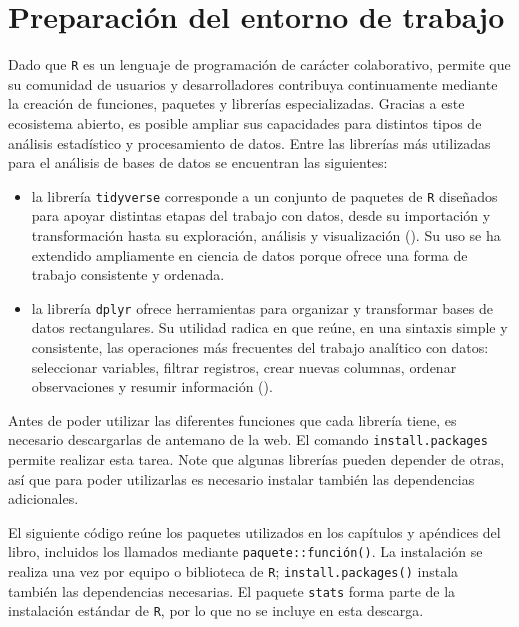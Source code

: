 \documentclass[
  spanish,
  11pt,
  letterpaper,
  oneside,
  open=any]{scrbook}
\begin{document}
\section{Preparación del entorno de
trabajo}\label{preparacion-del-entorno-de-trabajo}

Dado que \texttt{R} es un lenguaje de programación de carácter
colaborativo, permite que su comunidad de usuarios y desarrolladores
contribuya continuamente mediante la creación de funciones, paquetes y
librerías especializadas. Gracias a este ecosistema abierto, es posible
ampliar sus capacidades para distintos tipos de análisis estadístico y
procesamiento de datos. Entre las librerías más utilizadas para el
análisis de bases de datos se encuentran las siguientes:

\begin{itemize}
\item
  la librería \texttt{tidyverse} corresponde a un conjunto de paquetes
  de \texttt{R} diseñados para apoyar distintas etapas del trabajo con
  datos, desde su importación y transformación hasta su exploración,
  análisis y visualización (). Su uso se ha extendido ampliamente en ciencia
  de datos porque ofrece una forma de trabajo consistente y ordenada.
\item
  la librería \texttt{dplyr} ofrece herramientas para organizar y
  transformar bases de datos rectangulares. Su utilidad radica en que
  reúne, en una sintaxis simple y consistente, las operaciones más
  frecuentes del trabajo analítico con datos: seleccionar variables,
  filtrar registros, crear nuevas columnas, ordenar observaciones y
  resumir información ().
\end{itemize}

Antes de poder utilizar las diferentes funciones que cada librería
tiene, es necesario descargarlas de antemano de la web. El comando
\texttt{install.packages} permite realizar esta tarea. Note que algunas
librerías pueden depender de otras, así que para poder utilizarlas es
necesario instalar también las dependencias adicionales.

El siguiente código reúne los paquetes utilizados en los capítulos y
apéndices del libro, incluidos los llamados mediante
\texttt{paquete::función()}. La instalación se realiza una vez por
equipo o biblioteca de \texttt{R}; \texttt{install.packages()} instala
también las dependencias necesarias. El paquete \texttt{stats} forma
parte de la instalación estándar de \texttt{R}, por lo que no se incluye
en esta descarga.
\end{document}
